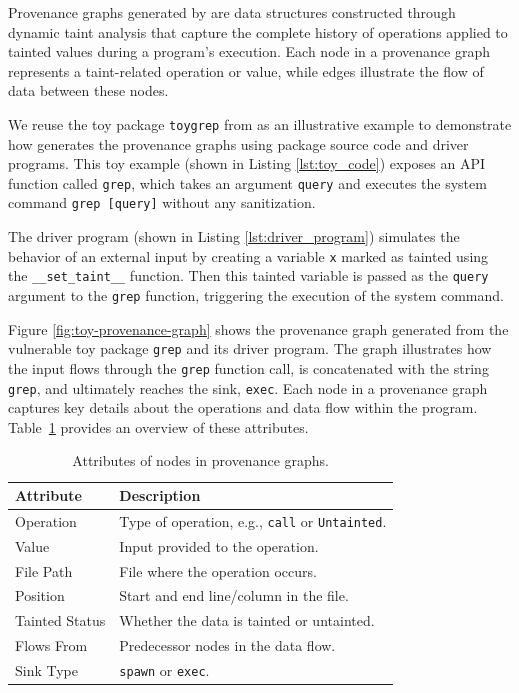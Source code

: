 \documentclass[12pt,openany,oneside,table]{cmuthesis}
\begin{document}
Provenance graphs generated by \nodemedicfine are data structures constructed through dynamic taint analysis that capture the complete history of operations applied to tainted values during a program’s execution. 
Each node in a provenance graph represents a taint-related operation or value, while edges illustrate the flow of data between these nodes.

We reuse the toy package \texttt{toygrep} from \nodemedic{} \cite{cassel2023nodemedic} as an illustrative example to demonstrate how \nodemedic generates the provenance graphs using package source code and driver programs. This toy example (shown in Listing \ref{lst:toy_code}) exposes an API function called \texttt{grep}, which takes an argument \texttt{query} and executes the system command \texttt{grep [query]} without any sanitization.

The driver program (shown in Listing \ref{lst:driver_program}) simulates the behavior of an external input by creating a variable \texttt{x} marked as tainted using the \texttt{\_\_set\_taint\_\_} function. Then this tainted variable is passed as the \texttt{query} argument to the \texttt{grep} function, triggering the execution of the system command.


Figure \ref{fig:toy-provenance-graph} shows the provenance graph generated from the vulnerable toy package \texttt{grep} and its driver program. The graph illustrates how the input flows through the \texttt{grep} function call, is concatenated with the string \texttt{grep}, and ultimately reaches the sink, \texttt{exec}.
Each node in a provenance graph captures key details about the operations and data flow within the program. Table~\ref{tab:node_attributes} provides an overview of these attributes.

\begin{table}[h]
\centering
\caption{Attributes of nodes in provenance graphs.\label{tab:node_attributes}}
\begin{tabular}{@{}ll@{}}
\toprule
\textbf{Attribute}          & \textbf{Description}                       \\ \midrule
Operation         & Type of operation, e.g., \texttt{call} or \texttt{Untainted}. \\ \midrule
Value             & Input provided to the operation.           \\ \midrule
File Path         & File where the operation occurs.           \\ \midrule
Position          & Start and end line/column in the file.     \\ \midrule
Tainted Status    & Whether the data is tainted or untainted.  \\ \midrule
Flows From        & Predecessor nodes in the data flow.        \\ \midrule
Sink Type         & \texttt{spawn} or \texttt{exec}. \\ \bottomrule
\end{tabular}
\end{table}
\end{document}
